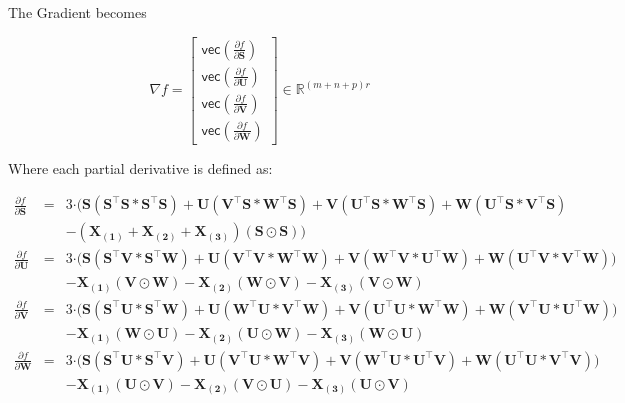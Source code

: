     The Gradient becomes

    \begin{equation}
        \nabla f =
        \left[
        \begin{array}{c}
                \mathsf{vec}(\frac{\partial f}{\partial \mathbf{S}})\\
                \mathsf{vec}(\frac{\partial f}{\partial \mathbf{U}})\\
                \mathsf{vec}(\frac{\partial f}{\partial \mathbf{V}})\\
                \mathsf{vec}(\frac{\partial f}{\partial \mathbf{W}})
        \end{array}
        \right]
        \in \mathbb{R}^{(m+n+p)r}
    \end{equation}

    Where each partial derivative is defined as:

    \begin{equation}
        \begin{array}{rcl}
            \frac{\partial f}{\partial \mathbf{S}} & = & \scriptstyle 3 \mathbf{\cdot \bigl(S\left(S^\intercal S\ast S^\intercal S\right) + U\left(V^\intercal S\ast W^\intercal S\right) + V\left(U^\intercal S\ast W^\intercal S\right) + W\left(U^\intercal S\ast V^\intercal S\right)}\\ 
            & & \scriptstyle - \mathbf{(X_{(1)} + X_{(2)} + X_{(3)})(S\odot S)}\bigl) \\

            \frac{\partial f}{\partial \mathbf{U}} & = & \scriptstyle 3\mathbf{\cdot \bigl(S\left(S^\intercal V\ast S^\intercal W\right) + U\left(V^\intercal V\ast W^\intercal W\right) + V\left(W^\intercal V\ast U^\intercal W\right) + W\left(U^\intercal V\ast V^\intercal W\right)\bigl)}\\ 
            & & \scriptstyle - \mathbf{X_{(1)}(V\odot W) - X_{(2)}(W\odot V) - X_{(3)}(V\odot W)} \\

            \frac{\partial f}{\partial \mathbf{V}} & = & \scriptstyle 3\mathbf{\cdot \bigl(S\left(S^\intercal U\ast S^\intercal W\right) + U\left(W^\intercal U\ast V^\intercal W\right) + V\left(U^\intercal U\ast W^\intercal W\right) + W\left(V^\intercal U\ast U^\intercal W\right)\bigl)}\\ 
            & & \scriptstyle - \mathbf{X_{(1)}(W\odot U) - X_{(2)}(U\odot W) - X_{(3)}(W\odot U)} \\

            \frac{\partial f}{\partial \mathbf{W}} & = & \scriptstyle 3\mathbf{\cdot \bigl(S\left(S^\intercal U\ast S^\intercal V\right) + U\left(V^\intercal U\ast W^\intercal V\right) + V\left(W^\intercal U\ast U^\intercal V\right) + W\left(U^\intercal U\ast V^\intercal V\right)\bigl)}\\ 
            & & \scriptstyle - \mathbf{X_{(1)}(U\odot V) - X_{(2)}(V\odot U) - X_{(3)}(U\odot V)}
        \end{array}
        \label{eq:ci_cp_dgn_partials}
    \end{equation}

